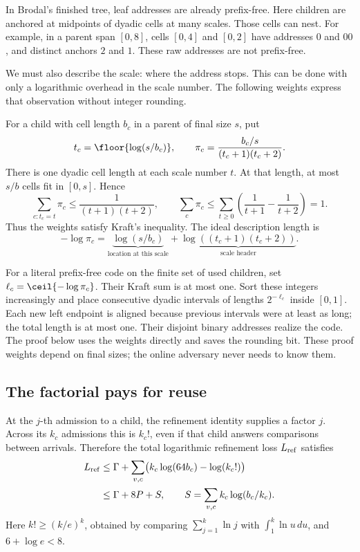 In Brodal's finished tree, leaf addresses are already prefix-free. Here children are anchored at midpoints of dyadic cells at many scales. Those cells can nest. For example, in a parent span \([0,8]\), cells \([0,4]\) and \([0,2]\) have addresses \(0\) and \(00\), and distinct anchors \(2\) and \(1\). These raw addresses are not prefix-free.

We must also describe the scale: where the address stops. This can be done with only a logarithmic overhead in the scale number. The following weights express that observation without integer rounding.

For a child with cell length \(b_c\) in a parent of final size \(s\), put
\begin{equation}\label{eq:codeweight}
t_c=\floor{\log(s/b_c)},\qquad
\pi_c=\frac{b_c/s}{(t_c+1)(t_c+2)}.
\end{equation}
There is one dyadic cell length at each scale number \(t\). At that length, at most \(s/b\) cells fit in \([0,s]\). Hence
\[
\sum_{c:t_c=t}\pi_c\le\frac1{(t+1)(t+2)},
\qquad
\sum_c\pi_c\le
\sum_{t\ge0}\left(\frac1{t+1}-\frac1{t+2}\right)=1.
\]
Thus the weights satisfy Kraft's inequality. The ideal description length is
\[
-\log\pi_c
=\underbrace{\log(s/b_c)}_{\text{location at this scale}}
+\underbrace{\log((t_c+1)(t_c+2))}_{\text{scale header}}.
\]

For a literal prefix-free code on the finite set of used children, set \(\ell_c=\ceil{-\log\pi_c}\). Their Kraft sum is at most one. Sort these integers increasingly and place consecutive dyadic intervals of lengths \(2^{-\ell_c}\) inside \([0,1]\). Each new left endpoint is aligned because previous intervals were at least as long; the total length is at most one. Their disjoint binary addresses realize the code. The proof below uses the weights directly and saves the rounding bit. These proof weights depend on final sizes; the online adversary never needs to know them.

\subsection{The factorial pays for reuse}

At the \(j\)-th admission to a child, the refinement identity supplies a factor \(j\). Across its \(k_c\) admissions this is \(k_c!\), even if that child answers comparisons between arrivals. Therefore the total logarithmic refinement loss \(L_{\rm ref}\) satisfies
\begin{equation}\label{eq:ref-cost-start}
\begin{aligned}
L_{\rm ref}
&\le\Gamma+\sum_{v,c}\bigl(k_c\log(64b_c)-\log(k_c!)\bigr)\\
&\le\Gamma+8P+S,\qquad
S=\sum_{v,c}k_c\log(b_c/k_c).
\end{aligned}
\end{equation}
Here \(k!\ge(k/e)^k\), obtained by comparing \(\sum_{j=1}^k\ln j\) with \(\int_1^k\ln u\,du\), and \(6+\log e<8\).

